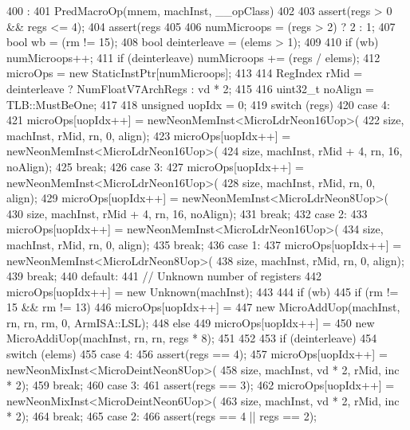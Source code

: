 \begin{DoxyCode}
400                                                                                :
401     PredMacroOp(mnem, machInst, __opClass)
402 {
403     assert(regs > 0 && regs <= 4);
404     assert(regs %
405 
406     numMicroops = (regs > 2) ? 2 : 1;
407     bool wb = (rm != 15);
408     bool deinterleave = (elems > 1);
409 
410     if (wb) numMicroops++;
411     if (deinterleave) numMicroops += (regs / elems);
412     microOps = new StaticInstPtr[numMicroops];
413 
414     RegIndex rMid = deinterleave ? NumFloatV7ArchRegs : vd * 2;
415 
416     uint32_t noAlign = TLB::MustBeOne;
417 
418     unsigned uopIdx = 0;
419     switch (regs) {
420       case 4:
421         microOps[uopIdx++] = newNeonMemInst<MicroLdrNeon16Uop>(
422                 size, machInst, rMid, rn, 0, align);
423         microOps[uopIdx++] = newNeonMemInst<MicroLdrNeon16Uop>(
424                 size, machInst, rMid + 4, rn, 16, noAlign);
425         break;
426       case 3:
427         microOps[uopIdx++] = newNeonMemInst<MicroLdrNeon16Uop>(
428                 size, machInst, rMid, rn, 0, align);
429         microOps[uopIdx++] = newNeonMemInst<MicroLdrNeon8Uop>(
430                 size, machInst, rMid + 4, rn, 16, noAlign);
431         break;
432       case 2:
433         microOps[uopIdx++] = newNeonMemInst<MicroLdrNeon16Uop>(
434                 size, machInst, rMid, rn, 0, align);
435         break;
436       case 1:
437         microOps[uopIdx++] = newNeonMemInst<MicroLdrNeon8Uop>(
438                 size, machInst, rMid, rn, 0, align);
439         break;
440       default:
441         // Unknown number of registers
442         microOps[uopIdx++] = new Unknown(machInst);
443     }
444     if (wb) {
445         if (rm != 15 && rm != 13) {
446             microOps[uopIdx++] =
447                 new MicroAddUop(machInst, rn, rn, rm, 0, ArmISA::LSL);
448         } else {
449             microOps[uopIdx++] =
450                 new MicroAddiUop(machInst, rn, rn, regs * 8);
451         }
452     }
453     if (deinterleave) {
454         switch (elems) {
455           case 4:
456             assert(regs == 4);
457             microOps[uopIdx++] = newNeonMixInst<MicroDeintNeon8Uop>(
458                     size, machInst, vd * 2, rMid, inc * 2);
459             break;
460           case 3:
461             assert(regs == 3);
462             microOps[uopIdx++] = newNeonMixInst<MicroDeintNeon6Uop>(
463                     size, machInst, vd * 2, rMid, inc * 2);
464             break;
465           case 2:
466             assert(regs == 4 || regs == 2);
}}}
\end{DoxyCode}
